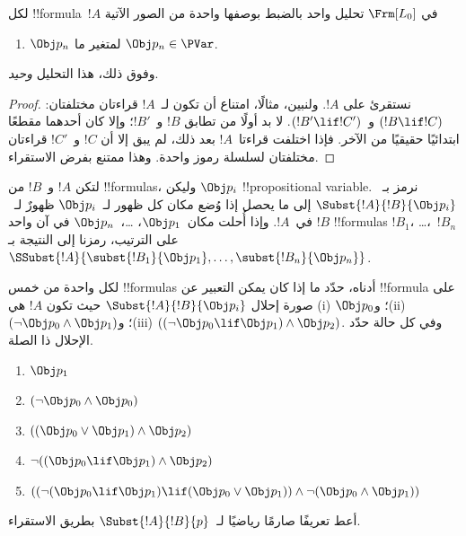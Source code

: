 \documentclass[../../../include/open-logic-section]{subfiles}
\begin{document}
\begin{prop}
لكل !!{formula}~$!A$ في $ \Frm[L_0]$ تحليل واحد بالضبط بوصفها واحدة من
الصور الآتية
\begin{enumerate}


\item $\Obj p_n$ لمتغير ما $\Obj p_n \in  \PVar$.





\end{enumerate}
وفوق ذلك، هذا التحليل \emph{وحيد}.
\end{prop}

\begin{proof}
نستقرئ على $!A$. ولنبين، مثالًا، امتناع أن تكون لـ~$!A$ قراءتان مختلفتان:
$(!B \lif !C)$ و~$(!B' \lif !C')$. لا بد أولًا من تطابق $!B$ و~$!B'$؛ وإلا كان أحدهما مقطعًا ابتدائيًا حقيقيًا من الآخر. فإذا اختلفت قراءتا~$!A$ بعد ذلك، لم يبق إلا أن $!C$ و~$!C'$ قراءتان مختلفتان لسلسلة رموز واحدة. وهذا ممتنع بفرض الاستقراء.
\end{proof}

\begin{defn}
لتكن $!A$ و~$!B$ من !!{formula}s، وليكن $\Obj p_i$ !!{propositional
variable}. نرمز بـ~$\Subst{!A}{!B}{\Obj p_i}$ إلى ما يحصل إذا وُضع مكان كل ظهور لـ~$\Obj p_i$ ظهورٌ لـ~$!B$ في~$!A$.
وإذا أُحلت مكان~$\Obj p_1$، \dots،~$\Obj p_n$ في آن واحد
!!{formula}s $!B_1$، \dots،~$!B_n$ على الترتيب، رمزنا إلى النتيجة بـ
$\SSubst{!A}{\subst{!B_1}{\Obj p_1},\dots,\subst{!B_n}{\Obj p_n}}$.
\end{defn}

\begin{prob} لكل واحدة من خمس !!{formula}s أدناه، حدّد ما إذا كان يمكن
 التعبير عن !!{formula} على صورة إحلال \( \Subst{!A}{!B}{\Obj p_i} \)
 حيث تكون \( !A \) هي (i) \( \Obj p_0 \)؛ و(ii) \( ( \lnot \Obj p_0 \land \Obj
 p_1) \)؛ و(iii) \( ( ( \lnot \Obj p_0 \lif \Obj p_1 ) \land \Obj
 p_2 ) \). وفي كل حالة حدّد الإحلال ذا الصلة.
  \begin{enumerate}
    \item \( \Obj p_1 \)
    \item \( ( \lnot \Obj p_0 \land \Obj p_0 ) \)
    \item \( ( ( \Obj p_0 \lor \Obj p_1 ) \land \Obj p_2 )  \)
    \item \( \lnot ( ( \Obj p_0 \lif \Obj p_1 ) \land \Obj p_2 ) \)
    \item \( (( \lnot ( \Obj p_0 \lif \Obj p_1 ) \lif ( \Obj p_0 \lor \Obj p_1 )) \land \lnot ( \Obj p_0 \land \Obj p_1 )) \)
  \end{enumerate}
\end{prob}

\begin{prob}
أعط تعريفًا صارمًا رياضيًا لـ~$\Subst{!A}{!B}{p}$ بطريق
الاستقراء.
\end{prob}
\end{document}
